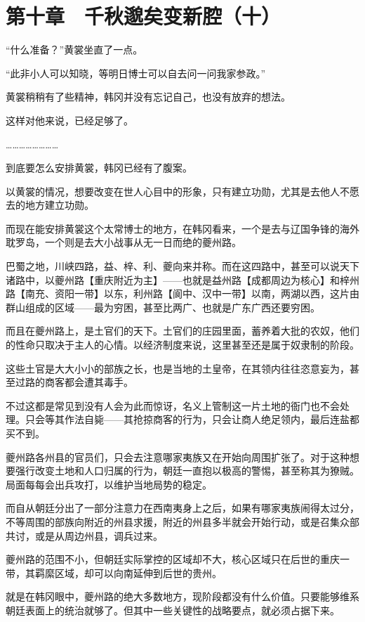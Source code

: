 \section{第十章　千秋邈矣变新腔（十）}

“什么准备？”黄裳坐直了一点。

“此非小人可以知晓，等明日博士可以自去问一问我家参政。”

黄裳稍稍有了些精神，韩冈并没有忘记自己，也没有放弃的想法。

这样对他来说，已经足够了。

……………………

到底要怎么安排黄裳，韩冈已经有了腹案。

以黄裳的情况，想要改变在世人心目中的形象，只有建立功勋，尤其是去他人不愿去的地方建立功勋。

而现在能安排黄裳这个太常博士的地方，在韩冈看来，一个是去与辽国争锋的海外耽罗岛，一个则是去大小战事从无一日而绝的夔州路。

巴蜀之地，川峡四路，益、梓、利、夔向来并称。而在这四路中，甚至可以说天下诸路中，以夔州路【重庆附近为主】——也就是益州路【成都周边为核心】和梓州路【南充、资阳一带】以东，利州路【阆中、汉中一带】以南，两湖以西，这片由群山组成的区域——最为穷困，甚至比两广、也就是广东广西还要穷困。

而且在夔州路上，是土官们的天下。土官们的庄园里面，蓄养着大批的农奴，他们的性命只取决于主人的心情。以经济制度来说，这里甚至还是属于奴隶制的阶段。

这些土官是大大小小的部族之长，也是当地的土皇帝，在其领内往往恣意妄为，甚至过路的商客都会遭其毒手。

不过这都是常见到没有人会为此而惊讶，名义上管制这一片土地的衙门也不会处理。只会等其作法自毙——其抢掠商客的行为，只会让商人绝足领内，最后连盐都买不到。

夔州路各州县的官员们，只会去注意哪家夷族又在开始向周围扩张了。对于这种想要强行改变土地和人口归属的行为，朝廷一直抱以极高的警惕，甚至称其为獠贼。局面每每会出兵攻打，以维护当地局势的稳定。

而自从朝廷分出了一部分注意力在西南夷身上之后，如果有哪家夷族闹得太过分，不等周围的部族向附近的州县求援，附近的州县多半就会开始行动，或是召集众部共讨，或是从周边州县，调兵过来。

夔州路的范围不小，但朝廷实际掌控的区域却不大，核心区域只在后世的重庆一带，其羁縻区域，却可以向南延伸到后世的贵州。

就是在韩冈眼中，夔州路的绝大多数地方，现阶段都没有什么价值。只要能够维系朝廷表面上的统治就够了。但其中一些关键性的战略要点，就必须占据下来。

